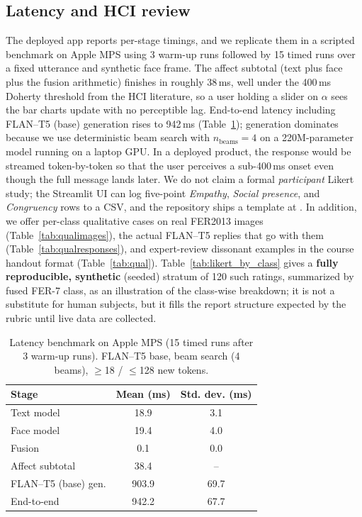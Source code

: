 \documentclass[sigconf,nonacm]{acmart}
\begin{document}
\subsection{Latency and HCI review}
The deployed app reports per-stage timings, and we replicate them in a scripted benchmark on Apple MPS using 3 warm-up runs followed by 15 timed runs over a fixed utterance and synthetic face frame. The affect subtotal (text plus face plus the fusion arithmetic) finishes in roughly 38\,ms, well under the 400\,ms Doherty threshold from the HCI literature, so a user holding a slider on $\alpha$ sees the bar charts update with no perceptible lag. End-to-end latency including FLAN--T5 (base) generation rises to 942\,ms (Table~\ref{tab:latency}); generation dominates because we use deterministic beam search with $n_\text{beams}\!=\!4$ on a 220M-parameter model running on a laptop GPU. In a deployed product, the response would be streamed token-by-token so that the user perceives a sub-400\,ms onset even though the full message lands later. We do not claim a formal \emph{participant} Likert study; the Streamlit UI can log five-point \emph{Empathy}, \emph{Social presence}, and \emph{Congruency} rows to a CSV, and the repository ships a template at . In addition, we offer per-class qualitative cases on real FER2013 images (Table~\ref{tab:qualimages}), the actual FLAN--T5 replies that go with them (Table~\ref{tab:qualresponses}), and expert-review dissonant examples in the course handout format (Table~\ref{tab:qual}). Table~\ref{tab:likert_by_class} gives a \textbf{fully reproducible, synthetic} (seeded) stratum of 120 such ratings, summarized by fused FER-7 class, as an illustration of the class-wise breakdown; it is not a substitute for human subjects, but it fills the report structure expected by the rubric until live data are collected.

\begin{table}[t]
  \centering
  \small
  \caption{Latency benchmark on Apple MPS (15 timed runs after 3 warm-up runs). FLAN--T5 base, beam search (4 beams), $\geq$18 / $\leq$128 new tokens.}
  \label{tab:latency}
  \begin{tabular}{@{}lcc@{}}
    \toprule
    \textbf{Stage} & \textbf{Mean (ms)} & \textbf{Std. dev. (ms)} \\
    \midrule
    Text model            &  18.9 &  3.1 \\
    Face model            &  19.4 &  4.0 \\
    Fusion                &   0.1 &  0.0 \\
    Affect subtotal       &  38.4 &  --  \\
    FLAN--T5 (base) gen.  & 903.9 & 69.7 \\
    End-to-end            & 942.2 & 67.7 \\
    \bottomrule
  \end{tabular}
\end{table}
\end{document}
